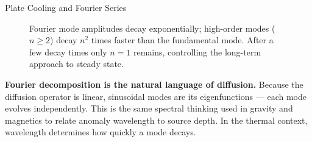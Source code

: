 \begin{activity}{Plate Cooling and Fourier Series}
{{\begin{figure}[h]
\caption{Fourier mode amplitudes decay exponentially; high-order modes ($n \geq 2$) decay $n^2$ times faster than the fundamental mode. After a few decay times only $n=1$ remains, controlling the long-term approach to steady state.}
\end{figure}
}

\textbf{Fourier decomposition is the natural language of diffusion.} Because the diffusion operator is linear, sinusoidal modes are its eigenfunctions --- each mode evolves independently. This is the same spectral thinking used in gravity and magnetics to relate anomaly wavelength to source depth. In the thermal context, wavelength determines how quickly a mode decays.
}

\end{activity}